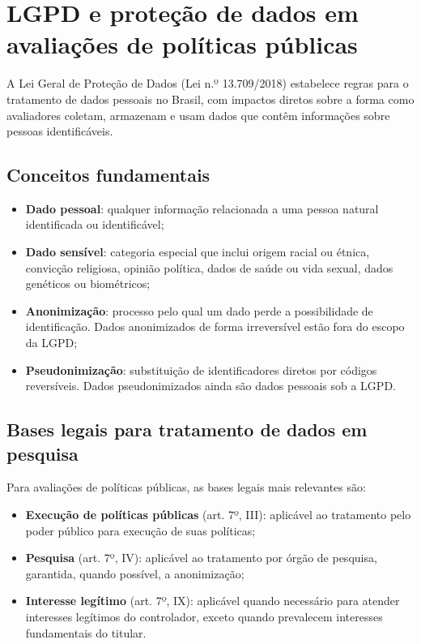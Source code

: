 \section{LGPD e proteção de dados em avaliações de políticas públicas}

A Lei Geral de Proteção de Dados (Lei n.º 13.709/2018) estabelece regras para o tratamento de dados pessoais no Brasil, com impactos diretos sobre a forma como avaliadores coletam, armazenam e usam dados que contêm informações sobre pessoas identificáveis.

\subsection{Conceitos fundamentais}

\begin{itemize}
  \item \textbf{Dado pessoal}: qualquer informação relacionada a uma pessoa natural identificada ou identificável;
  \item \textbf{Dado sensível}: categoria especial que inclui origem racial ou étnica, convicção religiosa, opinião política, dados de saúde ou vida sexual, dados genéticos ou biométricos;
  \item \textbf{Anonimização}: processo pelo qual um dado perde a possibilidade de identificação. Dados anonimizados de forma irreversível estão fora do escopo da LGPD;
  \item \textbf{Pseudonimização}: substituição de identificadores diretos por códigos reversíveis. Dados pseudonimizados ainda são dados pessoais sob a LGPD.
\end{itemize}

\subsection{Bases legais para tratamento de dados em pesquisa}

Para avaliações de políticas públicas, as bases legais mais relevantes são:

\begin{itemize}
  \item \textbf{Execução de políticas públicas} (art. 7º, III): aplicável ao tratamento pelo poder público para execução de suas políticas;
  \item \textbf{Pesquisa} (art. 7º, IV): aplicável ao tratamento por órgão de pesquisa, garantida, quando possível, a anonimização;
  \item \textbf{Interesse legítimo} (art. 7º, IX): aplicável quando necessário para atender interesses legítimos do controlador, exceto quando prevalecem interesses fundamentais do titular.
\end{itemize}

